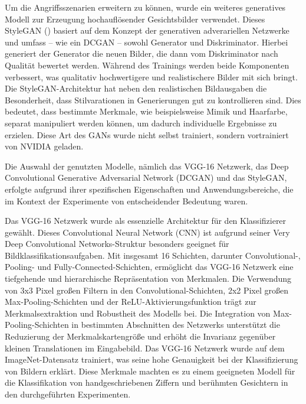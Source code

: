 Um die Angriffsszenarien erweitern zu können, wurde ein weiteres generatives Modell zur Erzeugung hochauflösender Gesichtsbilder verwendet. Dieses StyleGAN (\cite{karras_style-based_2019}) basiert auf dem Konzept der generativen adverariellen Netzwerke und umfass -- wie ein DCGAN -- sowohl Generator und Diskriminator. Hierbei generiert der Generator die neuen Bilder, die dann vom Diskriminator nach Qualität bewertet werden. Während des Trainings werden beide Komponenten verbessert, was qualitativ hochwertigere und realistischere Bilder mit sich bringt. Die StyleGAN-Architektur hat neben den realistischen Bildausgaben die Besonderheit, dass Stilvarationen in Generierungen gut zu kontrollieren sind. Dies bedeutet, dass bestimmte Merkmale, wie beispielsweise Mimik und Haarfarbe, separat manipuliert werden können, um dadurch individuelle Ergebnisse zu erzielen. Diese Art des GANs wurde nicht selbst trainiert, sondern vortrainiert von NVIDIA geladen.

Die Auswahl der genutzten Modelle, nämlich das VGG-16 Netzwerk, das Deep Convolutional Generative Adversarial Network (DCGAN) und das StyleGAN, erfolgte aufgrund ihrer spezifischen Eigenschaften und Anwendungsbereiche, die im Kontext der Experimente von entscheidender Bedeutung waren.

Das VGG-16 Netzwerk wurde als essenzielle Architektur für den Klassifizierer gewählt. Dieses Convolutional Neural Network (CNN) ist aufgrund seiner \glqq Very Deep Convolutional Networks\grqq-Struktur besonders geeignet für Bildklassifikationsaufgaben. Mit insgesamt 16 Schichten, darunter Convolutional-, Pooling- und Fully-Connected-Schichten, ermöglicht das VGG-16 Netzwerk eine tiefgehende und hierarchische Repräsentation von Merkmalen. Die Verwendung von 3x3 Pixel großen Filtern in den Convolutional-Schichten, 2x2 Pixel großen Max-Pooling-Schichten und der ReLU-Aktivierungsfunktion trägt zur Merkmalsextraktion und Robustheit des Modells bei. Die Integration von Max-Pooling-Schichten in bestimmten Abschnitten des Netzwerks unterstützt die Reduzierung der Merkmalskartengröße und erhöht die Invarianz gegenüber kleinen Translationen im Eingabebild. Das VGG-16 Netzwerk wurde auf dem ImageNet-Datensatz trainiert, was seine hohe Genauigkeit bei der Klassifizierung von Bildern erklärt. Diese Merkmale machten es zu einem geeigneten Modell für die Klassifikation von handgeschriebenen Ziffern und berühmten Gesichtern in den durchgeführten Experimenten.

